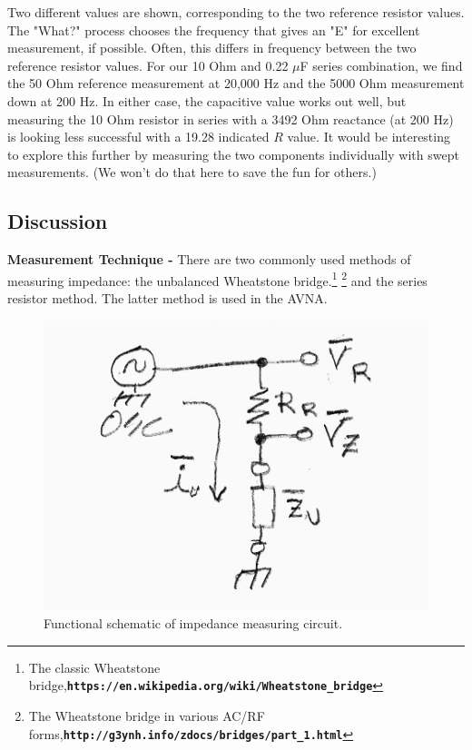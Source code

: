 %
Two different values are shown, corresponding to the two reference resistor values.  The "\textsf{What?}" process chooses the frequency that gives an "E" for excellent measurement, if possible.  Often, this differs in frequency between the two reference resistor values.  For our 10 Ohm and 0.22 $\mu$F series combination, we find the 50 Ohm reference measurement at 20,000 Hz and the 5000 Ohm measurement down at 200 Hz.  In either case, the capacitive value works out well, but measuring the 10 Ohm resistor in series with a 3492 Ohm reactance (at 200 Hz) is looking less successful with a 19.28 indicated \(R\) value.  It would be interesting to explore this further by measuring the two components individually with swept measurements. (We won't do that here to save the fun for others.)
%
\subsection{Discussion}
%
\textbf{Measurement Technique - } There are two commonly used methods of measuring impedance: the unbalanced Wheatstone bridge.\footnote{The classic Wheatstone bridge,\textbf{\texttt{https://en.wikipedia.org/wiki/Wheatstone\_bridge}}} \footnote{The Wheatstone bridge in various AC/RF forms,\textbf{\texttt{http://g3ynh.info/zdocs/bridges/part\_1.html}}}
%
 and the series resistor method.   The latter method is used in the AVNA.
\begin{figure}[H]
\begin{center}
\includegraphics[scale=0.75]{./images/AVNA_900.pdf}
\caption{Functional schematic of impedance measuring circuit.}
\label{AVNA_900-label}
\end{center}
\end{figure}
